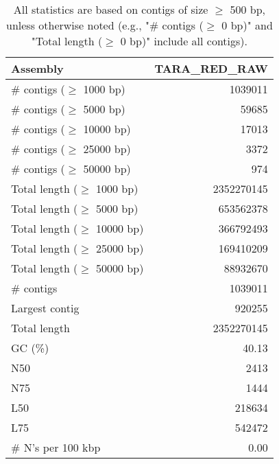 \documentclass[12pt,a4paper]{article}
\begin{document}
\begin{table}[ht]
\begin{center}
\caption{All statistics are based on contigs of size $\geq$ 500 bp, unless otherwise noted (e.g., "\# contigs ($\geq$ 0 bp)" and "Total length ($\geq$ 0 bp)" include all contigs).}
\begin{tabular}{|l*{1}{|r}|}
\hline
Assembly & TARA\_RED\_RAW \\ \hline
\# contigs ($\geq$ 1000 bp) & 1039011 \\ \hline
\# contigs ($\geq$ 5000 bp) & 59685 \\ \hline
\# contigs ($\geq$ 10000 bp) & 17013 \\ \hline
\# contigs ($\geq$ 25000 bp) & 3372 \\ \hline
\# contigs ($\geq$ 50000 bp) & 974 \\ \hline
Total length ($\geq$ 1000 bp) & 2352270145 \\ \hline
Total length ($\geq$ 5000 bp) & 653562378 \\ \hline
Total length ($\geq$ 10000 bp) & 366792493 \\ \hline
Total length ($\geq$ 25000 bp) & 169410209 \\ \hline
Total length ($\geq$ 50000 bp) & 88932670 \\ \hline
\# contigs & 1039011 \\ \hline
Largest contig & 920255 \\ \hline
Total length & 2352270145 \\ \hline
GC (\%) & 40.13 \\ \hline
N50 & 2413 \\ \hline
N75 & 1444 \\ \hline
L50 & 218634 \\ \hline
L75 & 542472 \\ \hline
\# N's per 100 kbp & 0.00 \\ \hline
\end{tabular}
\end{center}
\end{table}
\end{document}
